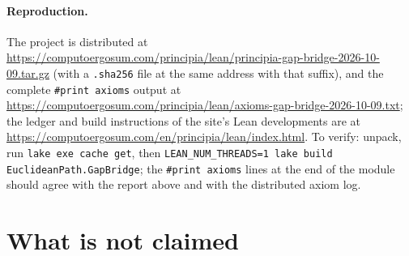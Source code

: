 \documentclass[11pt,a4paper]{article}
\theoremstyle{definition}
\theoremstyle{remark}
\newcommand{\code}[1]{\texttt{#1}}
\newcommand{\bundleurl}{https://computoergosum.com/principia/lean/principia-gap-bridge-2026-10-09.tar.gz}
\newcommand{\axiomsurl}{https://computoergosum.com/principia/lean/axioms-gap-bridge-2026-10-09.txt}
\begin{document}
\paragraph{Reproduction.}
The project is distributed at \url{\bundleurl} (with a \code{.sha256} file at the same address with that suffix), and the complete \code{\#print axioms} output at \url{\axiomsurl}; the ledger and build instructions of the site's Lean developments are at \url{https://computoergosum.com/en/principia/lean/index.html}.
To verify: unpack, run \code{lake exe cache get}, then \code{LEAN\_NUM\_THREADS=1 lake build EuclideanPath.GapBridge}; the \code{\#print axioms} lines at the end of the module should agree with the report above and with the distributed axiom log.

\section{What is not claimed}\label{sec:notclaimed}
\end{document}
